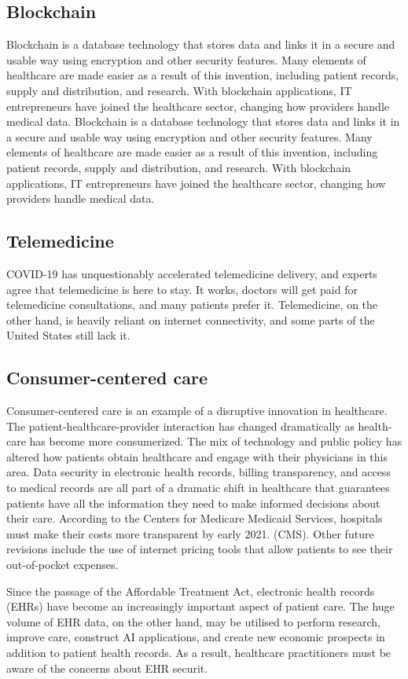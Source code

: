 \documentclass{article}
\begin{document}
\subsection{Blockchain}
Blockchain is a database technology that stores data and links it in a secure
and usable way using encryption and other security features. Many elements
of healthcare are made easier as a result of this invention, including patient
records, supply and distribution, and research. With blockchain applications,
IT entrepreneurs have joined the healthcare sector, changing how providers
handle medical data.
Blockchain is a database technology that stores data and links it in a secure
and usable way using encryption and other security features. Many elements
of healthcare are made easier as a result of this invention, including patient
records, supply and distribution, and research. With blockchain applications,
IT entrepreneurs have joined the healthcare sector, changing how providers
handle medical data.

\subsection{Telemedicine}
COVID-19 has unquestionably accelerated telemedicine delivery, and experts
agree that telemedicine is here to stay. It works, doctors will get paid for
telemedicine consultations, and many patients prefer it. Telemedicine, on the
other hand, is heavily reliant on internet connectivity, and some parts of the
United States still lack it.
\subsection{Consumer-centered care}
Consumer-centered care is an example of a disruptive innovation in healthcare.
The patient-healthcare-provider interaction has changed dramatically as health-
care has become more consumerized. The mix of technology and public policy
has altered how patients obtain healthcare and engage with their physicians in
this area.
Data security in electronic health records, billing transparency, and access to
medical records are all part of a dramatic shift in healthcare that guarantees
patients have all the information they need to make informed decisions about
their care. According to the Centers for Medicare Medicaid Services, hospitals
must make their costs more transparent by early 2021. (CMS). Other future
revisions include the use of internet pricing tools that allow patients to see their
out-of-pocket expenses.

Since the passage of the Affordable Treatment Act, electronic health records
(EHRs) have become an increasingly important aspect of patient care. The huge
volume of EHR data, on the other hand, may be utilised to perform research,
improve care, construct AI applications, and create new economic prospects in
addition to patient health records. As a result, healthcare practitioners must
be aware of the concerns about EHR securit.


%
%
\end{document}
